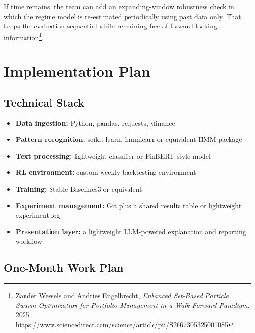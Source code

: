 \documentclass[11pt,a4paper]{article}
\newcommand{\fncite}[2]{\footnote{#1. \url{#2}}}
\begin{document}
If time remains, the team can add an expanding-window robustness check in which the regime model is re-estimated periodically using past data only. That keeps the evaluation sequential while remaining free of forward-looking information\fncite{Zander Wessels and Andries Engelbrecht, \emph{Enhanced Set-Based Particle Swarm Optimization for Portfolio Management in a Walk-Forward Paradigm}, 2025}{https://www.sciencedirect.com/science/article/pii/S2667305325001085}.

\section{Implementation Plan}

\subsection{Technical Stack}

\begin{itemize}[leftmargin=1.4em]
  \item \textbf{Data ingestion:} Python, pandas, requests, yfinance
  \item \textbf{Pattern recognition:} scikit-learn, hmmlearn or equivalent HMM package
  \item \textbf{Text processing:} lightweight classifier or FinBERT-style model
  \item \textbf{RL environment:} custom weekly backtesting environment
  \item \textbf{Training:} Stable-Baselines3 or equivalent
  \item \textbf{Experiment management:} Git plus a shared results table or lightweight experiment log
  \item \textbf{Presentation layer:} a lightweight LLM-powered explanation and reporting workflow
\end{itemize}

\subsection{One-Month Work Plan}
\end{document}
